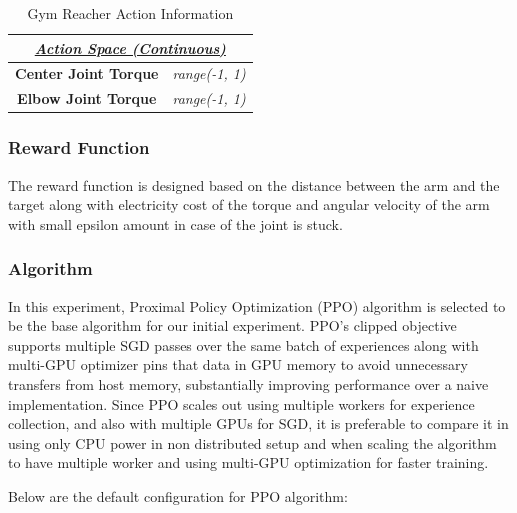 \begin{table}[!htb]
		\centering
		\begin{tabular}{|c|c|}
				\hline
				\multicolumn{2}{|c|}{{\ul \textit{\textbf{Action Space (Continuous)}}}}                             \\ \hline
				\multirow{2}{*}{\textbf{Center Joint Torque}} & \multirow{2}{*}{\textit{range(-1, 1)}} \\
																												&                                        \\ \hline
				\multirow{2}{*}{\textbf{Elbow Joint Torque}}  & \multirow{2}{*}{\textit{range(-1, 1)}} \\
																												&                                        \\ \hline
		\end{tabular}
				\caption{Gym Reacher Action Information}
				\label{tab:gym_reacher_actions}
\end{table}

\subsubsection{Reward Function}

The reward function is designed based on the distance between the arm and the target along with electricity cost of the torque and angular velocity of the arm with small epsilon amount in case of the joint is stuck. 

\subsubsection{Algorithm}

In this experiment, Proximal Policy Optimization (PPO) algorithm is selected to be the base algorithm for our initial experiment. PPO’s clipped objective supports multiple SGD passes over the same batch of experiences along with multi-GPU optimizer pins that data in GPU memory to avoid unnecessary transfers from host memory, substantially improving performance over a naive implementation. Since PPO scales out using multiple workers for experience collection, and also with multiple GPUs for SGD, it is preferable to compare it in using only CPU power in non distributed setup and when scaling the algorithm to have multiple worker and using multi-GPU optimization for faster training.

Below are the default configuration for PPO algorithm:


